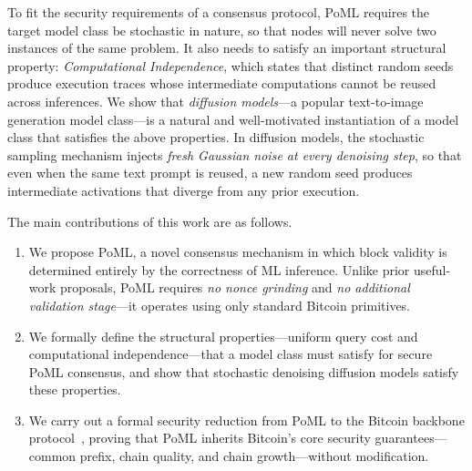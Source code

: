 To fit the security requirements of a consensus protocol, PoML requires the target model class be stochastic in nature, so that nodes will never solve two instances of the same problem. It also needs to satisfy an important structural property:  \emph{Computational Independence}, which states that distinct random seeds produce execution traces whose intermediate computations cannot be reused across inferences. We show that \emph{diffusion models}---a popular text-to-image generation model class---is a natural and well-motivated instantiation of a model class that satisfies the above properties. In diffusion models, the stochastic sampling mechanism injects \emph{fresh Gaussian noise at every denoising step}, so that even when the same text prompt is reused, a new random seed produces intermediate activations that diverge from any prior execution. 

The main contributions of this work are as follows. 
\begin{enumerate}
    \item We propose PoML, a novel consensus mechanism in which block validity is determined entirely by the correctness of ML inference. Unlike prior useful-work proposals, PoML requires \emph{no nonce grinding} and \emph{no additional validation stage}---it operates using only standard Bitcoin primitives.
    \item We formally define the structural properties---uniform query cost and computational independence---that a model class must satisfy for secure PoML consensus, and show that stochastic denoising diffusion models satisfy these properties.
    \item We carry out a formal security reduction from PoML to the Bitcoin backbone protocol~\cite{GKL20}, proving that PoML inherits Bitcoin's core security guarantees---common prefix, chain quality, and chain growth---without modification.
\end{enumerate}
